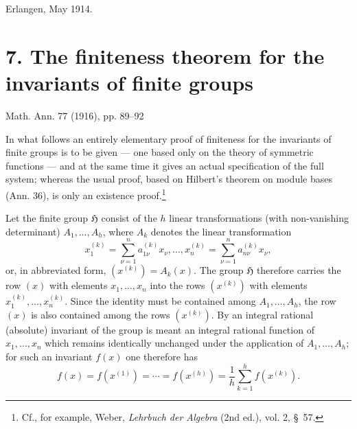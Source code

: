 \documentclass[11pt]{article}
\begin{document}
Erlangen, May 1914.

\clearpage

\providecommand{\Hgrp}{\mathfrak{H}}
\providecommand{\GaloisRes}{\Phi}
\providecommand{\pol}[2]{\left(#1\frac{\partial}{\partial #2}\right)}
\providecommand{\Deltaop}{\Delta\!\left(\frac{\partial}{\partial x},\frac{\partial}{\partial y},\frac{\partial}{\partial z}\right)}
\providecommand{\Omegaop}{\Omega}


\section*{7. The finiteness theorem for the invariants of finite groups}
\begin{center}
Math. Ann. 77 (1916), pp. 89--92
\end{center}

In what follows an entirely elementary proof of finiteness for the invariants of finite groups is to be given --- one based only on the theory of symmetric functions --- and at the same time it gives an actual specification of the full system; whereas the usual proof, based on Hilbert's theorem on module bases (Ann. 36), is only an existence proof.\footnote{Cf., for example, Weber, \emph{Lehrbuch der Algebra} (2nd ed.), vol. 2, \S\ 57.}

Let the finite group $\Hgrp$ consist of the $h$ linear transformations (with non-vanishing determinant) $A_1,\ldots,A_h$, where $A_k$ denotes the linear transformation
\[
  x_1^{(k)}=\sum_{\nu=1}^{n}a_{1\nu}^{(k)}x_\nu,\ldots,
  x_n^{(k)}=\sum_{\nu=1}^{n}a_{n\nu}^{(k)}x_\nu,
\]
or, in abbreviated form, $(x^{(k)})=A_k(x)$. The group $\Hgrp$ therefore carries the row $(x)$ with elements $x_1,
\ldots,x_n$ into the rows $(x^{(k)})$ with elements $x_1^{(k)},
\ldots,x_n^{(k)}$. Since the identity must be contained among $A_1,
\ldots,A_h$, the row $(x)$ is also contained among the rows $(x^{(k)})$. By an integral rational (absolute) invariant of the group is meant an integral rational function of $x_1,
\ldots,x_n$ which remains identically unchanged under the application of $A_1,
\ldots,A_h$; for such an invariant $f(x)$ one therefore has
\begin{equation}
  f(x)=f(x^{(1)})=\cdots=f(x^{(h)})=
  \frac1h\sum_{k=1}^{h}f(x^{(k)}).
\tag{1}
\end{equation}
\end{document}
